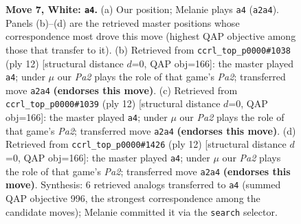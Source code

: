 \documentclass[11pt]{article}
\begin{document}
\begin{figure}[p]
\caption{\textbf{Move 7, White: \texttt{a4}.} (a) Our position; Melanie plays \texttt{a4} (\texttt{a2a4}). Panels (b)--(d) are the retrieved master positions whose correspondence most drove this move (highest QAP objective among those that transfer to it). (b) Retrieved from \texttt{ccrl\_top\_p0000\#1038} (ply 12) [structural distance $d$=0, QAP obj=166]: the master played \texttt{a4}; under $\mu$ our \emph{Pa2} plays the role of that game's \emph{Pa2}; transferred move \texttt{a2a4} \textbf{(endorses this move)}. (c) Retrieved from \texttt{ccrl\_top\_p0000\#1039} (ply 12) [structural distance $d$=0, QAP obj=166]: the master played \texttt{a4}; under $\mu$ our \emph{Pa2} plays the role of that game's \emph{Pa2}; transferred move \texttt{a2a4} \textbf{(endorses this move)}. (d) Retrieved from \texttt{ccrl\_top\_p0000\#1426} (ply 12) [structural distance $d$=0, QAP obj=166]: the master played \texttt{a4}; under $\mu$ our \emph{Pa2} plays the role of that game's \emph{Pa2}; transferred move \texttt{a2a4} \textbf{(endorses this move)}. Synthesis: 6 retrieved analogs transferred to \texttt{a4} (summed QAP objective 996, the strongest correspondence among the candidate moves); Melanie committed it via the \texttt{search} selector.}
\label{fig:thought-m12}
\end{figure}

\clearpage
\end{document}
